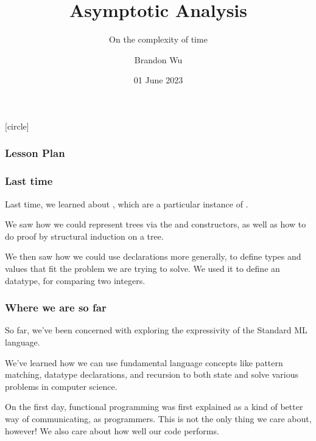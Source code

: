 \documentclass[aspectratio=169, handout]{beamer}
\title{Asymptotic Analysis} %
\subtitle{On the complexity of time} %
\date{01 June 2023} %
\author{Brandon Wu} %
\newif\ifcolorlambda
\begin{document}
\ifweb
    \renewcommand{\pause}{}
\fi

[circle]

{
\begin{frame}[plain]
    \colorlambdatrue
    \titlepage
\end{frame}
}

\begin{frame}[fragile]
  \frametitle{Lesson Plan}

  \tableofcontents
\end{frame}

\begin{frame}[fragile]
  \frametitle{Last time}

  Last time, we learned about , which are a particular instance of
  .

  \vspace{\fill}

  We saw how we could represent trees via the  and 
  constructors, as well as how to do proof by structural induction on a tree.

  \vspace{\fill}

  We then saw how we could use  declarations more generally, to
  define types and values that fit the problem we are trying to solve. We used
  it to define an  datatype, for comparing two integers.
\end{frame}


\begin{frame}[fragile]
  \frametitle{Where we are so far}

  So far, we've been concerned with exploring the expressivity of the Standard ML
  language.

  \pause
  \vspace{\fill}

  We've learned how we can use fundamental language concepts like
  pattern matching, datatype declarations, and recursion
  to both state and solve various problems in computer science.

  \pause
  \vspace{\fill}

  On the first day, functional programming was first explained as a kind of
  better way of communicating, as programmers. This is not the only thing we
  care about, however! We also care about how well our code performs.
\end{frame}
\end{document}
